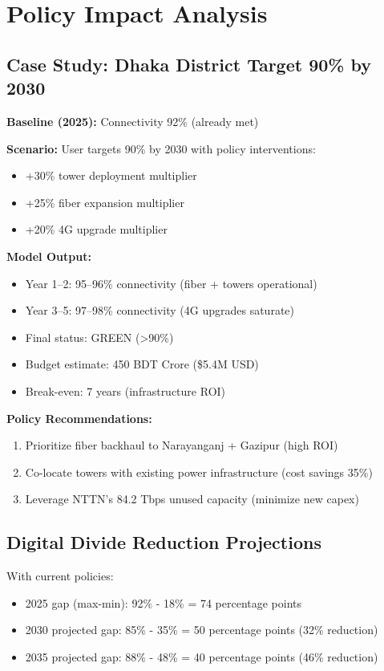 \documentclass[11pt,a4paper]{article}
\begin{document}
\section{Policy Impact Analysis}

\subsection{Case Study: Dhaka District Target 90\% by 2030}

\textbf{Baseline (2025):} Connectivity 92\% (already met)

\textbf{Scenario:} User targets 90\% by 2030 with policy interventions:
\begin{itemize}
  \item +30\% tower deployment multiplier
  \item +25\% fiber expansion multiplier
  \item +20\% 4G upgrade multiplier
\end{itemize}

\textbf{Model Output:}
\begin{itemize}
  \item Year 1–2: 95–96\% connectivity (fiber + towers operational)
  \item Year 3–5: 97–98\% connectivity (4G upgrades saturate)
  \item Final status: GREEN (>90\%)
  \item Budget estimate: 450 BDT Crore (\$5.4M USD)
  \item Break-even: 7 years (infrastructure ROI)
\end{itemize}

\textbf{Policy Recommendations:}
\begin{enumerate}
  \item Prioritize fiber backhaul to Narayanganj + Gazipur (high ROI)
  \item Co-locate towers with existing power infrastructure (cost savings 35\%)
  \item Leverage NTTN's 84.2 Tbps unused capacity (minimize new capex)
\end{enumerate}

\subsection{Digital Divide Reduction Projections}

With current policies:
\begin{itemize}
  \item 2025 gap (max-min): 92\% - 18\% = 74 percentage points
  \item 2030 projected gap: 85\% - 35\% = 50 percentage points (32\% reduction)
  \item 2035 projected gap: 88\% - 48\% = 40 percentage points (46\% reduction)
\end{itemize}
\end{document}
